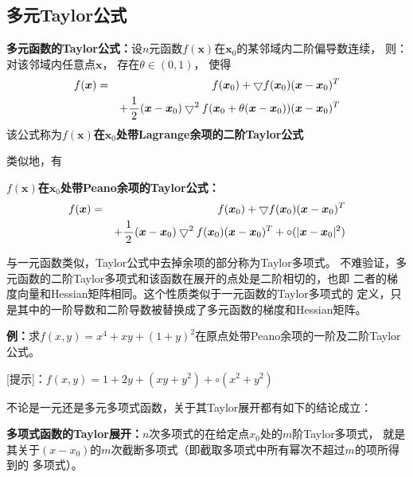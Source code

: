 \subsection{多元Taylor公式}

\begin{thx}
	{\bf 多元函数的Taylor公式：}设$n$元函数$f(\bm{x})$在$\bm{x}_0$的某邻域内二阶偏导数连续， 
	则：对该邻域内任意点$\bm{x}$， 存在$\theta\in(0,1)$， 使得
	\begin{eqnarray*}
		f(\bm{x}) & = & f(\bm{x}_0)+\bigtriangledown f(\bm{x}_0)(\bm{x}-\bm{x}_0)^T\\
		& & + \displaystyle\frac{\,{1}\,}{\,{2}\,}(\bm{x}-\bm{x}_0)\bigtriangledown^2
		f(\bm{x}_0+\theta(\bm{x}-\bm{x}_0))(\bm{x}-\bm{x}_0)^T
	\end{eqnarray*}
	该公式称为{\bf $f(\bm{x})$在$\bm{x}_0$处带Lagrange余项的二阶Taylor公式} 
\end{thx}
类似地，有
\begin{thx}
	{\bf $f(\bm{x})$在$\bm{x}_0$处带Peano余项的Taylor公式：}
	\begin{eqnarray*}
		f(\bm{x}) & = & f(\bm{x}_0)+\bigtriangledown f(\bm{x}_0)(\bm{x}-\bm{x}_0)^T\\
		& & + \displaystyle\frac{\,{1}\,}{\,{2}\,}(\bm{x}-\bm{x}_0)\bigtriangledown^2
		f(\bm{x}_0)(\bm{x}-\bm{x}_0)^T+\circ(|\bm{x}-\bm{x}_0|^2)
	\end{eqnarray*}
\end{thx}
与一元函数类似，Taylor公式中去掉余项的部分称为Taylor多项式。
不难验证，多元函数的二阶Taylor多项式和该函数在展开的点处是{\kaishu 二阶相切}的，也即
{\kaishu 二者的梯度向量和Hessian矩阵相同}。这个性质类似于一元函数的Taylor多项式的
定义，只是其中的一阶导数和二阶导数被替换成了多元函数的梯度和Hessian矩阵。

{\bf 例：}求$f(x,y)=x^4+xy+(1+y)^2$在原点处带Peano余项的一阶及二阶Taylor公式。

[提示]：$f(x,y)=1+2y+(xy+y^2)+\circ(x^2+y^2)$

不论是一元还是多元多项式函数，关于其Taylor展开都有如下的结论成立：
\begin{thx}
	{\bf 多项式函数的Taylor展开：}$n$次多项式的在给定点$x_0$处的$m$阶Taylor多项式，
	就是其关于$(x-x_0)$的$m$次截断多项式（即截取多项式中所有幂次不超过$m$的项所得到的
	多项式）。
\end{thx}

